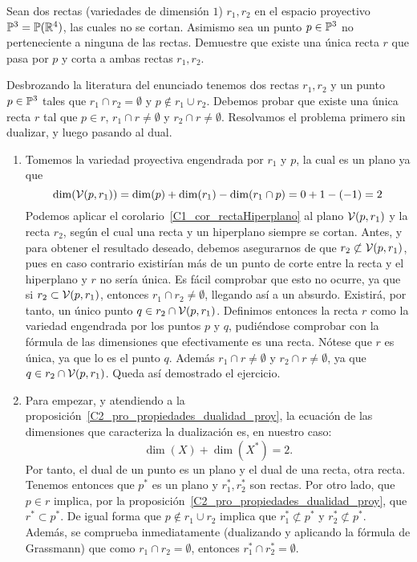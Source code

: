 \begin{exa}
	Sean dos rectas (variedades de dimensión $1$) $r_1,r_2$ en el espacio proyectivo $\mathbb{P}^3=\mathbb{P}(\mathbb{R}^4)$, las cuales no se cortan. Asimismo sea un punto $p\in\mathbb{P}^3$ no perteneciente a ninguna de las rectas. Demuestre que existe una única recta $r$ que pasa por $p$ y corta a ambas rectas $r_1, r_2$.
	
	Desbrozando la literatura del enunciado tenemos dos rectas $r_1,r_2$ y un punto $p\in\mathbb{P}^3$ tales que $r_1\cap r_2=\emptyset$ y $p\not\in r_1\cup r_2$. Debemos probar que existe una única recta $r$ tal que $p\in r$, $r_1\cap r\not=\emptyset$ y $r_2\cap r\not=\emptyset$. Resolvamos el problema primero sin dualizar, y luego pasando al dual.
	\begin{enumerate}
		\item Tomemos la variedad proyectiva engendrada por $r_1$ y $p$, la cual es un plano ya que
		\begin{equation*}
		\dim(\mathcal{V}(p,r_1))=\dim(p)+\dim(r_1)-\dim(r_1\cap p)=0+1-(-1)=2
		\end{equation*}
		Podemos aplicar el corolario~\ref{C1_cor_rectaHiperplano} al plano $\mathcal{V}(p,r_1)$ y la recta $r_2$, según el cual una recta y un hiperplano siempre se cortan. Antes, y para obtener el resultado deseado, debemos asegurarnos de que $r_2\not\subset\mathcal{V}(p,r_1)$, pues en caso contrario existirían más de un punto de corte entre la recta y el hiperplano y $r$ no sería única. Es fácil comprobar que esto no ocurre, ya que si $r_2\subset\mathcal{V}(p,r_1)$, entonces $r_1\cap r_2\not=\emptyset$, llegando así a un absurdo. Existirá, por tanto, un único punto $q\in r_2\cap\mathcal{V}(p,r_1)$. Definimos entonces la recta $r$ como la variedad engendrada por los puntos $p$ y $q$, pudiéndose comprobar con la fórmula de las dimensiones que efectivamente es una recta. Nótese que $r$ es única, ya que lo es el punto $q$. Además $r_1\cap r\not=\emptyset$ y $r_2\cap r\not=\emptyset$, ya que $q\in r_2\cap\mathcal{V}(p,r_1)$. Queda así demostrado el ejercicio.
		
		\item Para empezar, y atendiendo a la proposición~\ref{C2_pro_propiedades_dualidad_proy}, la ecuación de las dimensiones que caracteriza la dualización es, en nuestro caso:
		\begin{equation*}
		\dim(X)+\dim(X^*)=2. 
		\end{equation*}
		Por tanto, el dual de un punto es un plano y el dual de una recta, otra recta. Tenemos entonces que $p^*$ es un plano y $r_1^*,r_2^*$ son rectas. Por otro lado, que $p\in r$ implica, por la proposición~\ref{C2_pro_propiedades_dualidad_proy}, que $r^*\subset p^*$. De igual forma que $p\not\in r_1\cup r_2$ implica que $r_1^*\not\subset p^*$ y $r_2^*\not\subset p^*$. Además, se comprueba inmediatamente (dualizando y aplicando la fórmula de Grassmann) que como $r_1\cap r_2=\emptyset$, entonces $r_1^*\cap r_2^*=\emptyset$.
		

\end{enumerate}
\end{exa}
